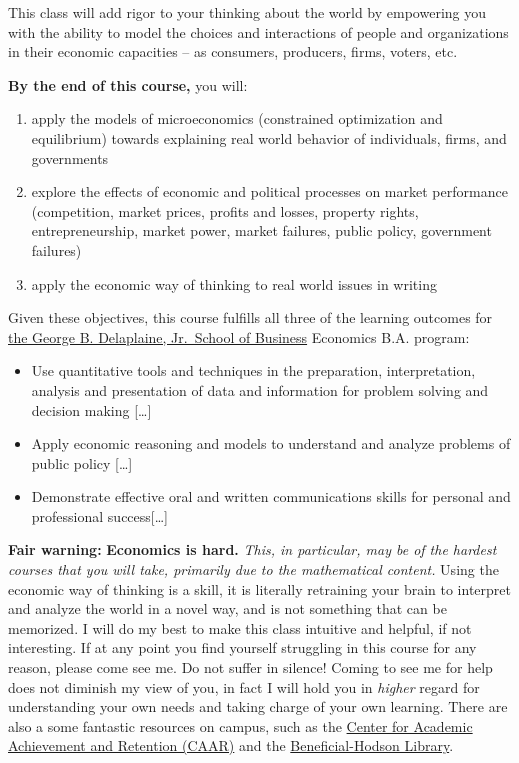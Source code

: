 \documentclass{article}
\providecommand{\tightlist}{%
  \setlength{\itemsep}{0pt}\setlength{\parskip}{0pt}}
\begin{document}
This class will add rigor to your thinking about the world by empowering
you with the ability to model the choices and interactions of people and
organizations in their economic capacities -- as consumers, producers,
firms, voters, etc.

\textbf{By the end of this course,} you will:

\begin{enumerate}
\def\labelenumi{\arabic{enumi}.}
\tightlist
\item
  apply the models of microeconomics (constrained optimization and
  equilibrium) towards explaining real world behavior of individuals,
  firms, and governments
\item
  explore the effects of economic and political processes on market
  performance (competition, market prices, profits and losses, property
  rights, entrepreneurship, market power, market failures, public
  policy, government failures)
\item
  apply the economic way of thinking to real world issues in writing
\end{enumerate}

Given these objectives, this course fulfills all three of the learning
outcomes for
\href{https://www.hood.edu/academics/departments/george-b-delaplaine-jr-school-business/student-learning-outcomes}{the
George B. Delaplaine, Jr.~School of Business} Economics B.A. program:

\begin{itemize}
\tightlist
\item
  Use quantitative tools and techniques in the preparation,
  interpretation, analysis and presentation of data and information for
  problem solving and decision making {[}\ldots{]}
\item
  Apply economic reasoning and models to understand and analyze problems
  of public policy {[}\ldots{]}
\item
  Demonstrate effective oral and written communications skills for
  personal and professional success{[}\ldots{]}
\end{itemize}

\textbf{Fair warning:} \textbf{Economics is hard.} \emph{This, in
particular, may be of the hardest courses that you will take, primarily
due to the mathematical content.} Using the economic way of thinking is
a skill, it is literally retraining your brain to interpret and analyze
the world in a novel way, and is not something that can be memorized. I
will do my best to make this class intuitive and helpful, if not
interesting. If at any point you find yourself struggling in this course
for any reason, please come see me. Do not suffer in silence! Coming to
see me for help does not diminish my view of you, in fact I will hold
you in \emph{higher} regard for understanding your own needs and taking
charge of your own learning. There are also a some fantastic resources
on campus, such as the
\href{http://www.hood.edu/campus-services/academic-services/index.html}{Center
for Academic Achievement and Retention (CAAR)} and the
\href{http://www.hood.edu/library/}{Beneficial-Hodson Library}.
\end{document}
